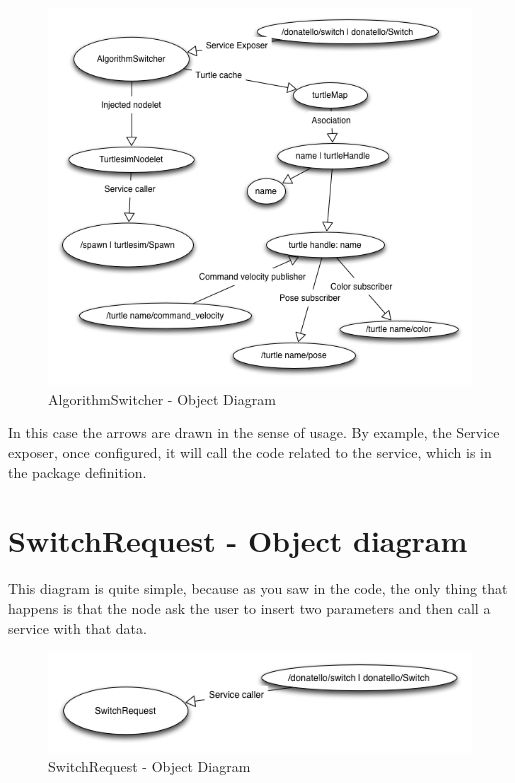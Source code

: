 \documentclass[a4paper,10pt,twoside]{book}
\begin{document}
\begin{figure}[!htbp]
\centering
\includegraphics[width=1\textwidth]{DonatelloObjectGraph.png}

\caption{AlgorithmSwitcher - Object Diagram}
\centering
\end{figure}

In this case the arrows are drawn in the sense of usage. By example, the Service exposer, once configured, it will call the code related to the service, which is in the package definition.


\section{ SwitchRequest - Object diagram}

This diagram is quite simple, because as you saw in the code, the only thing that happens is that the node ask the user to insert two parameters and then call a service with that data.

\begin{figure}[!htbp]
\centering
\includegraphics[width=1\textwidth]{DonatelloSRObjectGraph.png}

\caption{SwitchRequest - Object Diagram}
\centering
\end{figure}




\ifx\wholebook\relax\else
\end{document}
